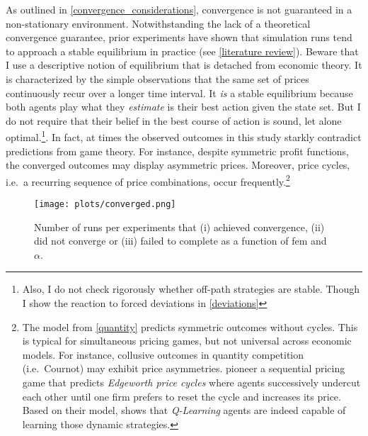 As outlined in \autoref{convergence_considerations}, convergence is not guaranteed in a non-stationary environment. Notwithstanding the lack of a theoretical convergence guarantee, prior experiments have shown that simulation runs tend to approach a stable equilibrium in practice (see \autoref{literature review}). Beware that I use a descriptive notion of equilibrium that is detached from economic theory. It is characterized by the simple observations that the same set of prices continuously recur over a longer time interval. It \emph{is} a stable equilibrium because both agents play what they \emph{estimate} is their best action given the state set. But I do not require that their belief in the best course of action is sound, let alone optimal.\footnote{Also, I do not check rigorously whether off-path strategies are stable. Though I show the reaction to forced deviations in \autoref{deviations}}. In fact, at times the observed outcomes in this study starkly contradict predictions from game theory. For instance, despite symmetric profit functions, the converged outcomes may display asymmetric prices. Moreover, price cycles, i.e.\ a recurring sequence of price combinations, occur frequently.\footnote{The model from \autoref{quantity} predicts symmetric outcomes without cycles. This is typical for simultaneous pricing games, but not universal across economic models. For instance, collusive outcomes in quantity competition (i.e.\ Cournot) may exhibit price asymmetries. \textcite{maskin_theory_1988} pioneer a sequential pricing game that predicts \emph{Edgeworth price cycles} where agents successively undercut each other until one firm prefers to reset the cycle and increases its price. Based on their model, \textcite{klein_autonomous_2019} shows that \emph{Q-Learning} agents are indeed capable of learning those dynamic strategies.}

\begin{figure}
	\texttt{[image: plots/converged.png]}
	\caption[Converged runs by \gls{fem} and $\alpha$]{Number of runs per experiments that (i) achieved convergence, (ii) did not converge or (iii) failed to complete as a function of \gls{fem} and $\alpha$.}
	\label{converged}
\end{figure}

